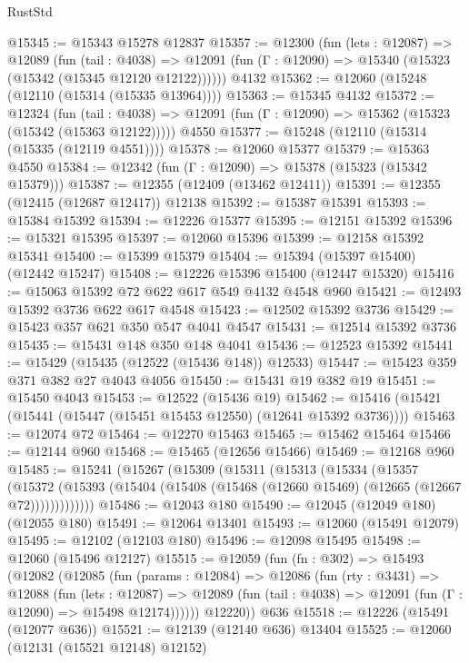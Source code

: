 \begin{lexlean}{RustStd}
\begin{coremodule}
@15345 := @15343 @15278 @12837
@15357 := @12300
    (fun (lets : @12087) =>
    @12089
      (fun (tail : @4038) =>
      @12091 (fun (Γ : @12090) => @15340 (@15323 (@15342 (@15345 @12120 @12122))))))
    @4132
@15362 := @12060 (@15248 (@12110 (@15314 (@15335 @13964))))
@15363 := @15345 @4132
@15372 := @12324
    (fun (tail : @4038) => @12091 (fun (Γ : @12090) => @15362 (@15323 (@15342 (@15363 @12122)))))
    @4550
@15377 := @15248 (@12110 (@15314 (@15335 (@12119 @4551))))
@15378 := @12060 @15377
@15379 := @15363 @4550
@15384 := @12342 (fun (Γ : @12090) => @15378 (@15323 (@15342 @15379)))
@15387 := @12355 (@12409 (@13462 @12411))
@15391 := @12355 (@12415 (@12687 @12417)) @12138
@15392 := @15387 @15391
@15393 := @15384 @15392
@15394 := @12226 @15377
@15395 := @12151 @15392
@15396 := @15321 @15395
@15397 := @12060 @15396
@15399 := @12158 @15392 @15341
@15400 := @15399 @15379
@15404 := @15394 (@15397 @15400) (@12442 @15247)
@15408 := @12226 @15396 @15400 (@12447 @15320)
@15416 := @15063 @15392 @72 @622 @617 @549 @4132 @4548 @960
@15421 := @12493 @15392 @3736 @622 @617 @4548
@15423 := @12502 @15392 @3736
@15429 := @15423 @357 @621 @350 @547 @4041 @4547
@15431 := @12514 @15392 @3736
@15435 := @15431 @148 @350 @148 @4041
@15436 := @12523 @15392
@15441 := @15429 (@15435 (@12522 (@15436 @148)) @12533)
@15447 := @15423 @359 @371 @382 @27 @4043 @4056
@15450 := @15431 @19 @382 @19
@15451 := @15450 @4043
@15453 := @12522 (@15436 @19)
@15462 := @15416 (@15421 (@15441 (@15447 (@15451 @15453 @12550) (@12641 @15392 @3736))))
@15463 := @12074 @72
@15464 := @12270 @15463
@15465 := @15462 @15464
@15466 := @12144 @960
@15468 := @15465 (@12656 @15466)
@15469 := @12168 @960
@15485 := @15241
    (@15267
      (@15309
        (@15311
          (@15313
            (@15334
              (@15357
                (@15372
                  (@15393 (@15404 (@15408 (@15468 (@12660 @15469) (@12665 (@12667 @72)))))))))))))
@15486 := @12043 @180
@15490 := @12045 (@12049 @180) (@12055 @180)
@15491 := @12064 @13401
@15493 := @12060 (@15491 @12079)
@15495 := @12102 (@12103 @180)
@15496 := @12098 @15495
@15498 := @12060 (@15496 @12127)
@15515 := @12059
    (fun (fn : @302) =>
    @15493
      (@12082
        (@12085
          (fun (params : @12084) =>
          @12086
            (fun (rty : @3431) =>
            @12088
              (fun (lets : @12087) =>
              @12089 (fun (tail : @4038) => @12091 (fun (Γ : @12090) => @15498 @12174))))))
        @12220))
    @636
@15518 := @12226 (@15491 (@12077 @636))
@15521 := @12139 (@12140 @636) @13404
@15525 := @12060 (@12131 (@15521 @12148) @12152)

\end{coremodule}
\end{lexlean}
